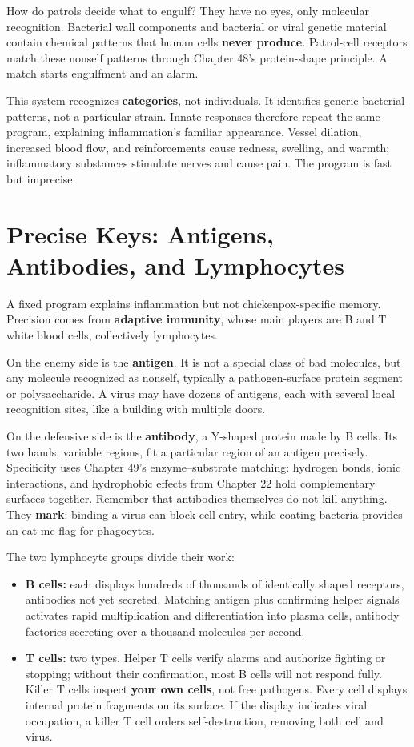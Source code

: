 How do patrols decide what to engulf? They have no eyes, only molecular recognition. Bacterial wall components and bacterial or viral genetic material contain chemical patterns that human cells \textbf{never produce}. Patrol-cell receptors match these nonself patterns through Chapter 48's protein-shape principle. A match starts engulfment and an alarm.

This system recognizes \textbf{categories}, not individuals. It identifies generic bacterial patterns, not a particular strain. Innate responses therefore repeat the same program, explaining inflammation's familiar appearance. Vessel dilation, increased blood flow, and reinforcements cause redness, swelling, and warmth; inflammatory substances stimulate nerves and cause pain. The program is fast but imprecise.

\section{Precise Keys: Antigens, Antibodies, and Lymphocytes}

A fixed program explains inflammation but not chickenpox-specific memory. Precision comes from \textbf{adaptive immunity}, whose main players are B and T white blood cells, collectively lymphocytes.

On the enemy side is the \textbf{antigen}. It is not a special class of bad molecules, but any molecule recognized as nonself, typically a pathogen-surface protein segment or polysaccharide. A virus may have dozens of antigens, each with several local recognition sites, like a building with multiple doors.

On the defensive side is the \textbf{antibody}, a Y-shaped protein made by B cells. Its two hands, variable regions, fit a particular region of an antigen precisely. Specificity uses Chapter 49's enzyme--substrate matching: hydrogen bonds, ionic interactions, and hydrophobic effects from Chapter 22 hold complementary surfaces together. Remember that antibodies themselves do not kill anything. They \textbf{mark}: binding a virus can block cell entry, while coating bacteria provides an eat-me flag for phagocytes.

The two lymphocyte groups divide their work:

\begin{itemize}[itemsep=2pt]
\item \textbf{B cells:} each displays hundreds of thousands of identically shaped receptors, antibodies not yet secreted. Matching antigen plus confirming helper signals activates rapid multiplication and differentiation into plasma cells, antibody factories secreting over a thousand molecules per second.
\item \textbf{T cells:} two types. Helper T cells verify alarms and authorize fighting or stopping; without their confirmation, most B cells will not respond fully. Killer T cells inspect \textbf{your own cells}, not free pathogens. Every cell displays internal protein fragments on its surface. If the display indicates viral occupation, a killer T cell orders self-destruction, removing both cell and virus.
\end{itemize}


